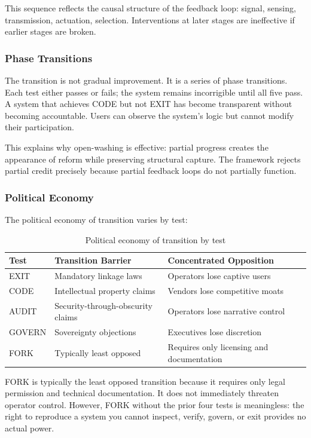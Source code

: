 \documentclass{article}
\begin{document}
This sequence reflects the causal structure of the feedback loop: signal, sensing, transmission, actuation, selection. Interventions at later stages are ineffective if earlier stages are broken.

\subsubsection{Phase Transitions}

The transition is not gradual improvement. It is a series of phase transitions. Each test either passes or fails; the system remains incorrigible until all five pass. A system that achieves CODE but not EXIT has become transparent without becoming accountable. Users can observe the system's logic but cannot modify their participation.

This explains why open-washing is effective: partial progress creates the appearance of reform while preserving structural capture. The framework rejects partial credit precisely because partial feedback loops do not partially function.

\subsubsection{Political Economy}

The political economy of transition varies by test:

\begin{table}[h]
\centering
\caption{Political economy of transition by test}
\label{tab:political-economy}
\begin{tabular}{lll}
\hline
\textbf{Test} & \textbf{Transition Barrier} & \textbf{Concentrated Opposition} \\
\hline
EXIT & Mandatory linkage laws & Operators lose captive users \\
CODE & Intellectual property claims & Vendors lose competitive moats \\
AUDIT & Security-through-obscurity claims & Operators lose narrative control \\
GOVERN & Sovereignty objections & Executives lose discretion \\
FORK & Typically least opposed & Requires only licensing and documentation \\
\hline
\end{tabular}
\end{table}

FORK is typically the least opposed transition because it requires only legal permission and technical documentation. It does not immediately threaten operator control. However, FORK without the prior four tests is meaningless: the right to reproduce a system you cannot inspect, verify, govern, or exit provides no actual power.
\end{document}
